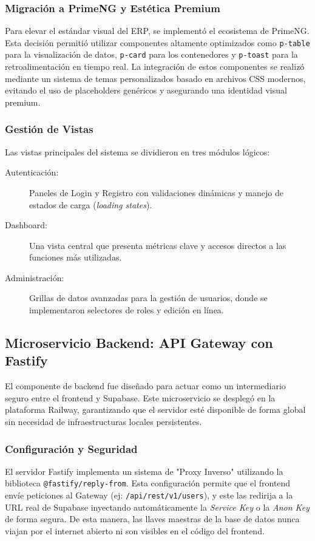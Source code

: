 \documentclass[12pt,a4paper]{article}
\begin{document}
\subsubsection{Migración a PrimeNG y Estética Premium}
Para elevar el estándar visual del ERP, se implementó el ecosistema de PrimeNG. Esta decisión permitió utilizar componentes altamente optimizados como \texttt{p-table} para la visualización de datos, \texttt{p-card} para los contenedores y \texttt{p-toast} para la retroalimentación en tiempo real. La integración de estos componentes se realizó mediante un sistema de temas personalizados basado en archivos CSS modernos, evitando el uso de placeholders genéricos y asegurando una identidad visual premium.

\subsubsection{Gestión de Vistas}
Las vistas principales del sistema se dividieron en tres módulos lógicos:
\begin{description}
    \item[Autenticación:] Paneles de Login y Registro con validaciones dinámicas y manejo de estados de carga (\textit{loading states}).
    \item[Dashboard:] Una vista central que presenta métricas clave y accesos directos a las funciones más utilizadas.
    \item[Administración:] Grillas de datos avanzadas para la gestión de usuarios, donde se implementaron selectores de roles y edición en línea.
\end{description}

\subsection{Microservicio Backend: API Gateway con Fastify}
El componente de backend fue diseñado para actuar como un intermediario seguro entre el frontend y Supabase. Este microservicio se desplegó en la plataforma Railway, garantizando que el servidor esté disponible de forma global sin necesidad de infraestructuras locales persistentes.

\subsubsection{Configuración y Seguridad}
El servidor Fastify implementa un sistema de "Proxy Inverso" utilizando la biblioteca \texttt{@fastify/reply-from}. Esta configuración permite que el frontend envíe peticiones al Gateway (ej: \texttt{/api/rest/v1/users}), y este las redirija a la URL real de Supabase inyectando automáticamente la \textit{Service Key} o la \textit{Anon Key} de forma segura. De esta manera, las llaves maestras de la base de datos nunca viajan por el internet abierto ni son visibles en el código del frontend.
\end{document}
